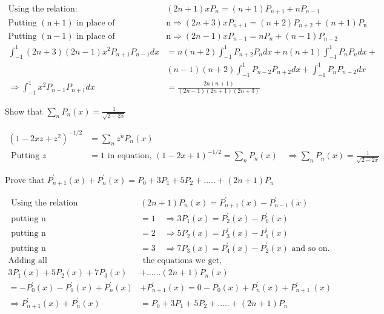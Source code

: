 \begin{answer}
	\begin{align*}
	\text{Using the relation: }&(2 n+1) x P_{n}=(n+1) P_{n+1}+n P_{n-1}\\
	\text{Putting $(\mathrm{n}+1)$ in place of }&\mathrm{n} \Rightarrow(2 n+3) x P_{n+1}=(n+2) P_{n+2}+(n+1) P_{\mathrm{n}}\\
	\text{Putting $(\mathrm{n}-1)$ in place of }&\mathrm{n} \Rightarrow(2 n-1) x P_{n-1}=n P_{n}+(n-1) P_{n-2}\\
	\int_{-1}^{1}(2 n+3)(2 n-1) x^{2} P_{n+1} P_{n-1} d x&=n(n+2) \int_{-1}^{1} P_{n+2} P_{n} d x+n(n+1) \int_{-1}^{1} P_{n} P_{n} d x+\\
	&(n-1)(n+2) \int_{-1}^{1} P_{n-2} P_{n+2} d x+\int_{-1}^{1} P_{n} P_{n-2} d x\\
	\Rightarrow \int_{-1}^{1} x^{2} P_{n-1} P_{n+1} d x&=\frac{2 n(n+1)}{(2 n-1)(2 n+1)(2 n+3)}
	\end{align*}
\end{answer}
\begin{exercise}
	Show that $\sum_{n} P_{n}(x)=\frac{1}{\sqrt{2-2 x}}$
\end{exercise}
\begin{answer}
	\begin{align*}
	\left(1-2 x z+z^{2}\right)^{-1 / 2}&=\sum_{n} z^{n} P_{n}(x)\\
	\text { Putting } z&=1 \text { in equation, }(1-2 x+1)^{-1 / 2}=\sum_{n} P_{n}(x) \quad \Rightarrow \sum_{n} P_{n}(x)=\frac{1}{\sqrt{2-2 x}}
	\end{align*}
\end{answer}
\begin{exercise}
	Prove that $P_{n+1}^{\prime}(x)+P_{n}^{\prime}(x)=P_{0}+3 P_{1}+5 P_{2}+\ldots . .+(2 n+1) P_{n}$
\end{exercise}
\begin{answer}
	\begin{align*}
	\text { Using the relation }&(2 n+1) P_{n}(x)=P_{n+1}^{\prime}(x)-P_{n-1}^{\prime}(\dot{x})\\
	\text { putting } \mathrm{n}&=1 \quad \Rightarrow 3 P_{1}(x)=P_{2}^{\prime}(x)-P_{0}^{\prime}(x)\\
	\text { putting } \mathrm{n}&=2 \quad \Rightarrow 5 P_{2}(x)=P_{3}^{\prime}(x)-P_{1}^{\prime}(x)\\
	\text { putting } \mathrm{n}&=3 \quad \Rightarrow 7 P_{3}(x)=P_{4}^{\prime}(x)-P_{2}^{\prime}(x) \text { and so on. }\\
	\text{Adding all}&\text{ the equations we get,}\\
	3 P_{1}(x)+5 P_{2}(x)+7 P_{3}(x)&+\ldots \ldots(2 n+1) P_{n}(x)\\
	=-P_{0}^{\prime}(x)-P_{1}^{\prime}(x)+P_{n}^{\prime}(x)&+P_{n+1}^{\prime}(x)=0-P_{0}(x)+P_{n}^{\prime}(x)+P_{n+1}^{\prime}{ }^{\cdot}(x)\\
	\Rightarrow P_{n+1}^{\prime}(x)+P_{n}^{\prime}(x)&=P_{0}+3 P_{1}+5 P_{2}+\ldots . .+(2 n+1) P_{n}
	\end{align*}
\end{answer}
